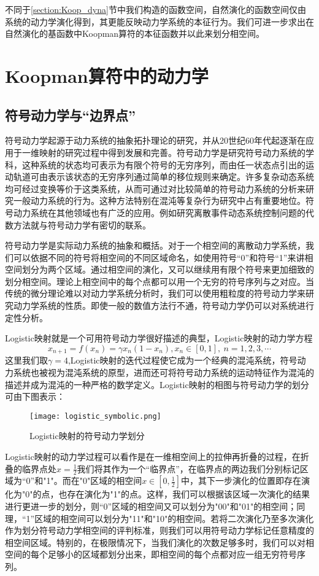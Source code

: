 不同于\ref{section:Koop_dyna}节中我们构造的函数空间，自然演化的函数空间仅由系统的动力学演化得到，其更能反映动力学系统的本征行为。我们可进一步求出在自然演化的基函数中Koopman算符的本征函数并以此来划分相空间。

\section{Koopman算符中的动力学}

\subsection{符号动力学与“边界点”}

符号动力学起源于动力系统的抽象拓扑理论的研究，并从20世纪60年代起逐渐在应用于一维映射的研究过程中得到发展和完善。符号动力学是研究符号动力系统的学科，这种系统的状态均可表示为有限个符号的无穷序列，而由任一状态点引出的运动轨道可由表示该状态的无穷序列通过简单的移位规则来确定。许多复杂动态系统均可经过变换等价于这类系统，从而可通过对比较简单的符号动力系统的分析来研究一般动力系统的行为。这种方法特别在混沌等复杂行为研究中占有重要地位。符号动力系统在其他领域也有广泛的应用。例如研究离散事件动态系统控制问题的代数方法就与符号动力学有密切的联系。

符号动力学是实际动力系统的抽象和概括。对于一个相空间的离散动力学系统，我们可以依据不同的符号将相空间的不同区域命名，如使用符号“0”和符号“1”来讲相空间划分为两个区域。通过相空间的演化，又可以继续用有限个符号来更加细致的划分相空间。理论上相空间中的每个点都可以用一个无穷的符号序列与之对应。当传统的微分理论难以对动力学系统分析时，我们可以使用粗粒度的符号动力学来研究动力学系统的性质。即使一般的数值方法行不通，符号动力学仍可以对系统进行定性分析。

Logistic映射就是一个可用符号动力学很好描述的典型，Logistic映射的动力学方程
\begin{equation}
    x_{n+1}=f(x_n)=\gamma x_n (1-x_n ),x_n∈[0,1],\ n=1,2,3,\cdots
\end{equation}
这里我们取$\gamma=4$,Logistic映射的迭代过程使它成为一个经典的混沌系统，符号动力系统也被视为混沌系统的原型，进而还可将符号动力系统的运动特征作为混沌的描述并成为混沌的一种严格的数学定义。Logistic映射的相图与符号动力学的划分可由下图表示：
\begin{figure}
	\centering
	\texttt{[image: logistic\_symbolic.png]}
    \caption{Logistic映射的符号动力学划分}
    \label{fig:logi_symb}
\end{figure}
Logistic映射的动力学过程可以看作是在一维相空间上的拉伸再折叠的过程，在折叠的临界点处$x=\frac{1}{2}$我们将其作为一个“临界点”，在临界点的两边我们分别标记区域为“0”和"1"。而在"0"区域的相空间$x\in [0,\frac{1}{2}]$中，其下一步演化的位置即存在演化为"0"的点，也存在演化为"1"的点。这样，我们可以根据该区域一次演化的结果进行更进一步的划分，则“0”区域的相空间又可以划分为"00"和"01"的相空间；同理，“1”区域的相空间可以划分为"11"和"10"的相空间。若将二次演化乃至多次演化作为划分符号动力学相空间的评判标准，则我们可以用符号动力学标记任意精度的相空间区域。特别的，在极限情况下，当我们演化的次数足够多时，我们可以对相空间的每个足够小的区域都划分出来，即相空间的每个点都对应一组无穷符号序列。

